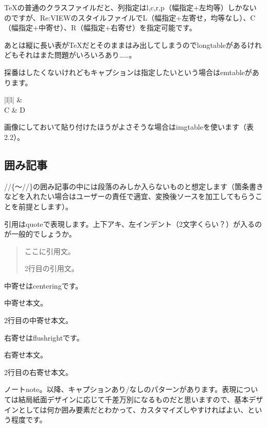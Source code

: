 TeXの普通のクラスファイルだと、列指定はl,c,r,p（幅指定+左均等）しかないのですが、Re:VIEWのスタイルファイルでL（幅指定+左寄せ，均等なし）、C（幅指定+中寄せ）、R（幅指定+右寄せ）を指定可能です。

あとは縦に長い表がTeXだとそのままはみ出してしまうのでlongtableがあるけれどもそれはまた問題がいろいろあり……。

採番はしたくないけれどもキャプションは指定したいという場合はemtableがあります。


\begin{reviewtable}{|l|l|}
\hline
{} &  \\  \hline
C & D \\  \hline
\end{reviewtable}

画像にしておいて貼り付けたほうがよさそうな場合はimgtableを使います（表2.2）。


\subsection{囲み記事}
\label{sec:2-1-4}

//\{〜//\}の囲み記事の中には段落のみしか入らないものと想定します（箇条書きなどを入れたい場合はユーザーの責任で適宜、変換後ソースを加工してもらうことを前提とします）。

引用はquoteで表現します。上下アキ、左インデント（2文字くらい？）が入るのが一般的でしょうか。


\begin{quote}
ここに引用文。  

2行目の引用文。
\end{quote}

中寄せはcenteringです。

中寄せ本文。  

2行目の中寄せ本文。

右寄せはflushrightです。

右寄せ本文。  

2行目の右寄せ本文。

ノートnote。以降、キャプションあり/なしのパターンがあります。表現については結局紙面デザインに応じて千差万別になるものだと思いますので、基本デザインとしては何か囲み要素だとわかって、カスタマイズしやすければよい、という程度です。

